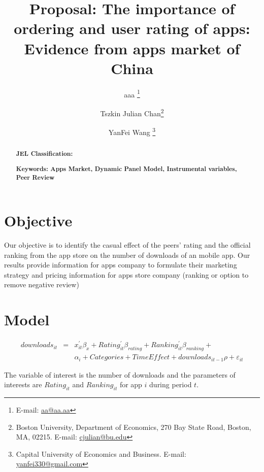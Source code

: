 \documentclass[11pt,twoside]{article}
\title{Proposal: The importance of ordering and user rating of apps: Evidence from apps market of China }
\author { 
	aaa \footnote{E-mail:  \protect\url{aa@aa.aa}} 
	\and Tszkin Julian Chan\footnote{Boston University, Department of Economics, 270 Bay State Road, Boston, MA, 02215. E-mail: \protect\url{cjulian@bu.edu}} 
	\and YanFei Wang \footnote{ Capital University of Economics and Business. E-mail: \protect\url{yanfei330@gmail.com}} 
}
\begin{document}
\maketitle
\begin{abstract}
\noindent \textbf{JEL Classification: } 

\noindent \textbf{Keywords: Apps Market, Dynamic Panel Model, Instrumental variables, Peer Review}  

\end{abstract}
\newpage


\section{Objective}
Our objective is to identify the casual effect of the peers' rating and the official ranking from the app store on the number of downloads of an mobile app. Our results provide information for apps company to formulate their marketing strategy and pricing information for apps store company (ranking or option to remove negative review)

\section{Model}

\begin{eqnarray} \label{eq:basic_eq}
	downloads_{it} &=& x_{it}^{'} \beta_{x} + Rating_{it}^{'} \beta_{rating} + Ranking_{it}^{'} \beta_{ranking} + \\
	&& \alpha_i + Categories + TimeEffect +  downloads_{it-1} \rho + \varepsilon_{it}
\end{eqnarray}
	
	The variable of interest is the number of downloads and the parameters of interests are $Rating_{it}$ and $Ranking_{it}$ for app $i$ during period $t$. 
\end{document}
